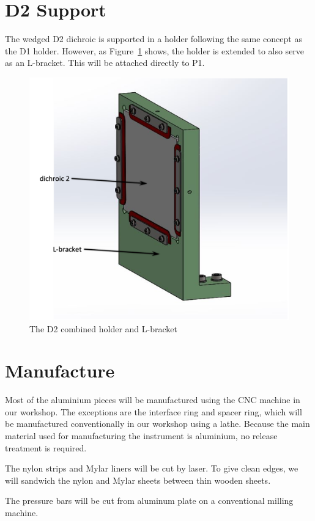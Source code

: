 \documentclass{report}
\begin{document}
\section{D2 Support}

The wedged D2 dichroic is supported in a holder following the same concept as the D1 holder. However, as Figure~\ref{figure:d2-general} shows, the holder is extended to also serve as an L-bracket. This will be attached directly to P1.

\begin{figure}
\begin{center}
\includegraphics[width=0.7\linewidth]{figures/d2-general.png}
\end{center}
\caption{The D2 combined holder and L-bracket}
\label{figure:d2-general}
\end{figure}

\section{Manufacture}

Most of the aluminium pieces will be manufactured using the CNC machine in our workshop. The exceptions are the interface ring and spacer ring, which will be manufactured conventionally in our workshop using a lathe. Because the main material used for manufacturing the instrument is aluminium, no release treatment is required.

The nylon strips and Mylar liners will be cut by laser. To give clean edges, we will sandwich the nylon and Mylar sheets between thin wooden sheets.

The pressure bars will be cut from aluminum plate on a conventional milling machine.
\end{document}
